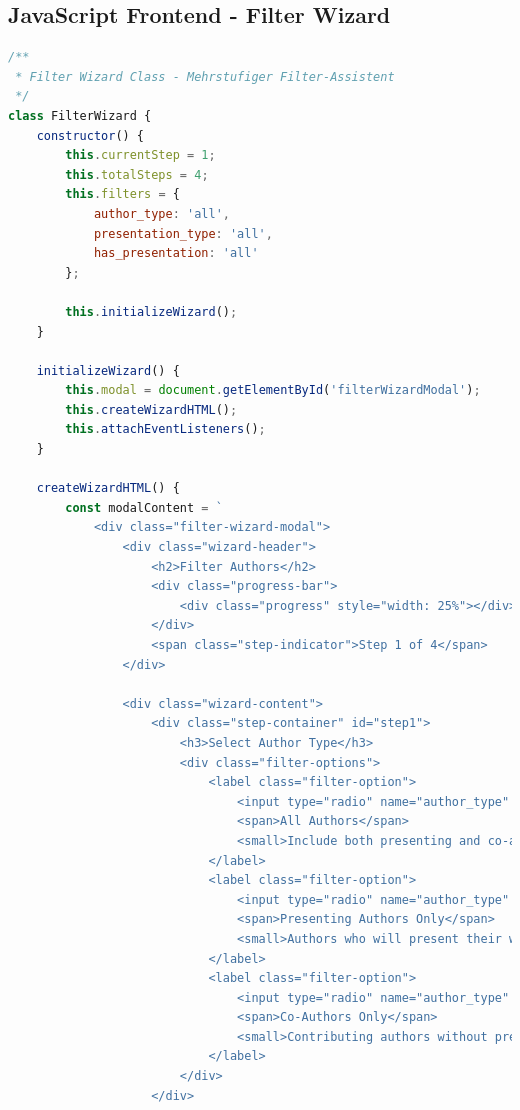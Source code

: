 \documentclass[11pt,a4paper]{article}
\begin{document}
\subsection{JavaScript Frontend - Filter Wizard}
\begin{lstlisting}[language=JavaScript, caption=Filter-Wizard Implementation]
/**
 * Filter Wizard Class - Mehrstufiger Filter-Assistent
 */
class FilterWizard {
    constructor() {
        this.currentStep = 1;
        this.totalSteps = 4;
        this.filters = {
            author_type: 'all',
            presentation_type: 'all',
            has_presentation: 'all'
        };
        
        this.initializeWizard();
    }
    
    initializeWizard() {
        this.modal = document.getElementById('filterWizardModal');
        this.createWizardHTML();
        this.attachEventListeners();
    }
    
    createWizardHTML() {
        const modalContent = `
            <div class="filter-wizard-modal">
                <div class="wizard-header">
                    <h2>Filter Authors</h2>
                    <div class="progress-bar">
                        <div class="progress" style="width: 25%"></div>
                    </div>
                    <span class="step-indicator">Step 1 of 4</span>
                </div>
                
                <div class="wizard-content">
                    <div class="step-container" id="step1">
                        <h3>Select Author Type</h3>
                        <div class="filter-options">
                            <label class="filter-option">
                                <input type="radio" name="author_type" value="all" checked>
                                <span>All Authors</span>
                                <small>Include both presenting and co-authors</small>
                            </label>
                            <label class="filter-option">
                                <input type="radio" name="author_type" value="presenting">
                                <span>Presenting Authors Only</span>
                                <small>Authors who will present their work</small>
                            </label>
                            <label class="filter-option">
                                <input type="radio" name="author_type" value="co_authors">
                                <span>Co-Authors Only</span>
                                <small>Contributing authors without presentation</small>
                            </label>
                        </div>
                    </div>
                    

\end{lstlisting}
\end{document}
